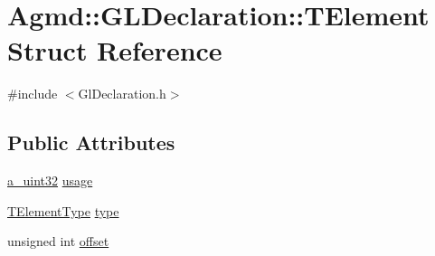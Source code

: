 \hypertarget{struct_agmd_1_1_g_l_declaration_1_1_t_element}{\section{Agmd\+:\+:G\+L\+Declaration\+:\+:T\+Element Struct Reference}
\label{struct_agmd_1_1_g_l_declaration_1_1_t_element}
}


{\ttfamily \#include $<$Gl\+Declaration.\+h$>$}

\subsection*{Public Attributes}
\begin{DoxyCompactItemize}
\item 
\hyperlink{_common_defines_8h_a964296f9770051b9e4807b1f180dd416}{a\+\_\+uint32} \hyperlink{struct_agmd_1_1_g_l_declaration_1_1_t_element_a796bbcb9bce6a238d006fefa1d001aee}{usage}
\item 
\hyperlink{namespace_agmd_aabcc5a3451e707f32340a8ace597c088}{T\+Element\+Type} \hyperlink{struct_agmd_1_1_g_l_declaration_1_1_t_element_a8f24568d3013aa7499676a1528470462}{type}
\item 
unsigned int \hyperlink{struct_agmd_1_1_g_l_declaration_1_1_t_element_aca50cf0d3e49cd4b2b769aa00b08e2dc}{offset}
\end{DoxyCompactItemize}


